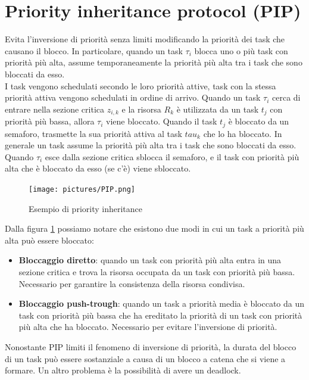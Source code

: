 \documentclass[12pt,openany,onesided]{book}
\begin{document}
\section{Priority inheritance protocol (PIP)}
Evita l'inversione di priorità senza limiti modificando la priorità dei task che causano il blocco.
In particolare, quando un task $\tau_i$ blocca uno o più task con priorità più alta, assume temporaneamente la priorità più alta tra i task che sono bloccati da esso.
\\
I task vengono schedulati secondo le loro priorità attive, task con la stessa priorità attiva vengono schedulati in ordine di arrivo.
Quando un task $\tau_i$ cerca di entrare nella sezione critica $z_{i,k}$ e la risorsa $R_k$ è utilizzata da un task $t_j$ con priorità più bassa, allora $\tau_i$ viene bloccato.
Quando il task $t_j$ è bloccato da un semaforo, trasmette la sua priorità attiva al task $tau_k$ che lo ha bloccato. In generale un task assume la priorità più alta tra i task che sono bloccati da esso.
Quando $\tau_i$ esce dalla sezione critica sblocca il semaforo, e il task con priorità più alta che è bloccato da esso (se c'è) viene sbloccato.
\begin{figure}[H]
    \centering
    \texttt{[image: pictures/PIP.png]}
    \caption{Esempio di priority inheritance}
    \label{fig:priorityInheritance}
\end{figure}
\noindent
Dalla figura \ref{fig:priorityInheritance} possiamo notare che esistono due modi in cui un task a priorità più alta può essere bloccato:
\begin{itemize}
    \item \textbf{Bloccaggio diretto}: quando un task con priorità più alta entra in una sezione critica e trova la risorsa occupata da un task con priorità più bassa. Necessario per garantire la consistenza della risorsa condivisa.
    \item \textbf{Bloccaggio push-trough}: quando un task a priorità media è bloccato da un task con priorità più bassa che ha ereditato la priorità di un task con priorità più alta che ha bloccato. Necessario per evitare l'inversione di priorità.
\end{itemize}
Nonostante PIP limiti il fenomeno di inversione di priorità, la durata del blocco di un task può essere sostanziale a causa di un blocco a catena che si viene a formare.
Un altro problema è la possibilità di avere un deadlock.
\end{document}
